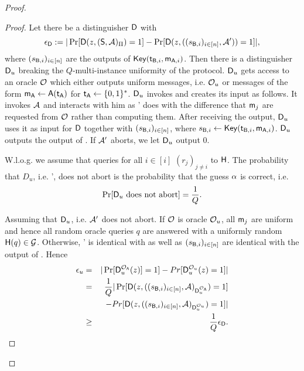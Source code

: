\begin{proof}
\begin{proof}
Let there be a distinguisher $\mathsf D$ with
$$
\epsilon_{\mathsf D}:=|\Pr[\mathsf D(z,(\mathsf{S}, \mathcal{A})_{\Pi})=1] -\Pr[\mathsf D(z,((s_{\mathsf{B},i})_{i\in[n]},\mathcal{A}'))=1]|,
$$
where $(s_{\mathsf{B},i})_{i\in[n]}$ are the outputs of $\mathsf{Key}(\mathsf{t}_{\mathsf{B},i},\mathsf{m}_{\mathsf{A},i})$. Then there is a distinguisher $\mathsf D_u$ breaking the $Q$-multi-instance uniformity of the \UKA protocol. $\mathsf D_u$ gets access to an oracle $\mathcal{O}$ which either outputs uniform messages, i.e. $\mathcal{O}_u$ or messages of  the form $\mathsf{m}_\mathsf{A}\leftarrow\mathsf{A}(\mathsf{t}_\mathsf{A})$ for $\mathsf{t}_\mathsf{A}\leftarrow\{0,1\}^*$. $\mathsf D_u$ invokes \D and creates its input as follows. It invokes $\mathcal{A}$ and interacts with him as \Adv' does with the difference that $\mathsf{m}_j$ are requested from $\mathcal{O}$ rather than computing them.  After receiving the output, $\mathsf D_u$ uses it as input for $\mathsf D$ together with $(s_{\mathsf{B},i})_{i\in[n]}$, where $s_{\mathsf{B},i}\leftarrow\mathsf{Key}(\mathsf{t}_{\mathsf{B},i},\mathsf{m}_{\mathsf{A},i})$. $\mathsf D_u$ outputs the output of \D. If $\mathcal{A}'$ aborts, we let $\mathsf D_u$ output $0$.

W.l.o.g. we assume that \Adv queries for all $i\in[i]$ $(r_j)_{j\neq i}$ to $\mathsf{H}$. The probability that $D_u$, i.e. \Adv', does not abort is the probability that the guess $\alpha$ is correct, i.e.
$$
\Pr[\mathsf D_u\text{ does not abort}]=\frac{1}{Q}.
$$

Assuming that $\mathsf D_u$, i.e. $\mathcal{A}'$ does not abort. If $\mathcal{O}$ is oracle $\mathcal{O}_{u}$, all $\mathsf{m}_j$ are uniform and hence all random oracle queries $q$ are answered with a uniformly random $\mathsf{H}(q)\in\mathcal{G}$.  Otherwise, \Adv' is identical with \send as well as $(s_{\mathsf{B},i})_{i\in[n]}$ are identical with the output of \send.  
Hence 
\begin{eqnarray*}
\epsilon_{u}&=&|\Pr[\mathsf D_u^{\mathcal{O}_{\mathsf{A}}}(z)]=1]-Pr[\mathsf D_u^{\mathcal{O}_{u}}(z)=1]|\\
&= &\frac{1}{Q}|\Pr[\mathsf D(z,((s_{\mathsf{B},i})_{i\in[n]},\mathcal{A})_{\mathsf D_u^{\mathcal{O}_{\mathsf{A}}}})=1]\\
&&-Pr[\mathsf D(z,((s_{\mathsf{B},i})_{i\in[n]},\mathcal{A})_{\mathsf D_u^{\mathcal{O}_{u}}})=1]|\\
&\geq&\frac{1}{Q}\epsilon_{\mathsf D}.
\end{eqnarray*}




\end{proof}
\end{proof}

